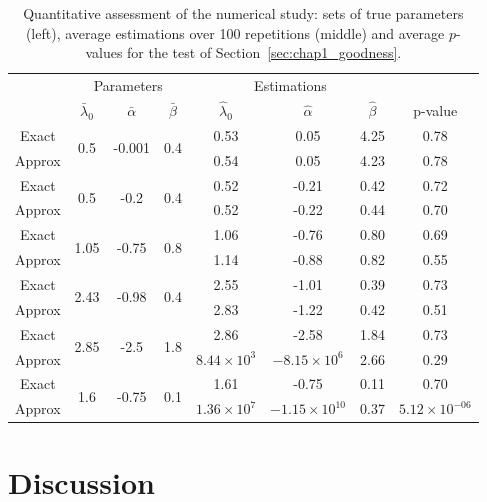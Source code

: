\begin{table}[!ht]
\centering
\begin{tabular}{cccc|ccc|c}
\hline
    & \multicolumn{3}{c}{Parameters} & \multicolumn{3}{c}{Estimations} & \\
   & $\bar \lambda_0$ &  $\bar \alpha$ &  $\bar \beta$ & $\hat \lambda_0$ &  $\hat \alpha$ &  $\hat \beta$ &  p-value \\
\hline
       Exact&\multirow{2}{*}{0.5 } & \multirow{2}{*}{-0.001 } & \multirow{2}{*}{0.4} &       0.53 & 0.05 & 4.25 & 0.78\\
       Approx&      &       &       & 0.54 & 0.05 & 4.23 & 0.78\\ \hline
       Exact&\multirow{2}{*}{0.5 } & \multirow{2}{*}{-0.2 } & \multirow{2}{*}{0.4 } &       0.52 & -0.21 & 0.42  & 0.72    \\
       Approx&      &       &       &0.52 & -0.22 & 0.44 & 0.70\\ \hline
       Exact&\multirow{2}{*}{1.05 } & \multirow{2}{*}{-0.75 } & \multirow{2}{*}{0.8 } &       1.06 & -0.76 & 0.80 & 0.69  \\
       Approx&      &       &       &1.14 & -0.88 & 0.82 & 0.55\\ \hline
       Exact&\multirow{2}{*}{2.43 } & \multirow{2}{*}{-0.98 } & \multirow{2}{*}{0.4} &       2.55 & -1.01 & 0.39 & 0.73  \\
       Approx&      &       &       & 2.83 & -1.22 & 0.42 & 0.51 \\ \hline
       Exact&\multirow{2}{*}{2.85 } & \multirow{2}{*}{-2.5 } & \multirow{2}{*}{1.8} &       2.86 & -2.58 & 1.84 & 0.73\\
       Approx&      &       &       &$8.44\times10^{3}$ & $-8.15\times10^{6}$ & 2.66  & 0.29\\ \hline
       Exact&\multirow{2}{*}{1.6 } & \multirow{2}{*}{-0.75 } & \multirow{2}{*}{0.1} &       1.61 & -0.75 & 0.11 & 0.70   \\
       Approx&      &       &       &$1.36\times10^{7} $& $-1.15\times10^{10}$  & 0.37  & $5.12\times10^{-06}$\\
\hline
\end{tabular}
\caption{
Quantitative assessment of the numerical study: sets of true parameters (left), average estimations over 100 repetitions (middle) and average \(p\)-values for the test of Section~\ref{sec:chap1_goodness}.
}
\label{table:chap1_estim_pvalue}
\end{table}

\section{Discussion}


